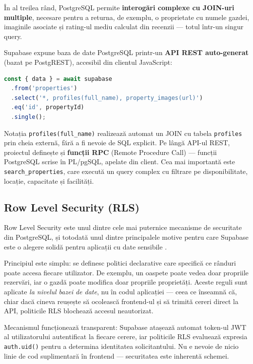\documentclass[12pt,a4paper,oneside]{report}
\begin{document}
În al treilea rând, PostgreSQL permite \textbf{interogări complexe cu JOIN-uri multiple}, necesare pentru a returna, de exemplu, o proprietate cu numele gazdei, imaginile asociate și rating-ul mediu calculat din recenzii — totul într-un singur query.

Supabase expune baza de date PostgreSQL printr-un \textbf{API REST auto-generat} (bazat pe PostgREST), accesibil din clientul JavaScript:

\begin{lstlisting}[language=TypeScript, caption={Interogare Supabase cu relații}]
const { data } = await supabase
  .from('properties')
  .select('*, profiles(full_name), property_images(url)')
  .eq('id', propertyId)
  .single();
\end{lstlisting}

Notația \texttt{profiles(full\_name)} realizează automat un JOIN cu tabela \texttt{profiles} prin cheia externă, fără a fi nevoie de SQL explicit. Pe lângă API-ul REST, proiectul definește și \textbf{funcții RPC} (Remote Procedure Call) — funcții PostgreSQL scrise în PL/pgSQL, apelate din client. Cea mai importantă este \texttt{search\_properties}, care execută un query complex cu filtrare pe disponibilitate, locație, capacitate și facilități.

\subsection{Row Level Security (RLS)}

Row Level Security este unul dintre cele mai puternice mecanisme de securitate din PostgreSQL, și totodată unul dintre principalele motive pentru care Supabase este o alegere solidă pentru aplicații cu date sensibile \cite{supabase-rls}.

Principiul este simplu: se definesc politici declarative care specifică ce rânduri poate accesa fiecare utilizator. De exemplu, un oaspete poate vedea doar propriile rezervări, iar o gazdă poate modifica doar propriile proprietăți. Aceste reguli sunt aplicate \textit{la nivelul bazei de date}, nu în codul aplicației — ceea ce înseamnă că, chiar dacă cineva reușește să ocolească frontend-ul și să trimită cereri direct la API, politicile RLS blochează accesul neautorizat.

Mecanismul funcționează transparent: Supabase atașează automat token-ul JWT al utilizatorului autentificat la fiecare cerere, iar politicile RLS evaluează expresia \texttt{auth.uid()} pentru a determina identitatea solicitantului. Nu e nevoie de nicio linie de cod suplimentară în frontend — securitatea este inherentă schemei.
\end{document}
